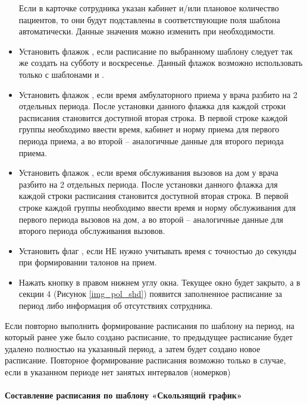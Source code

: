 \begin{itemize}
 Если в карточке сотрудника указан кабинет и/или плановое количество пациентов, то они будут подставлены в соответствующие поля шаблона автоматически. Данные значения можно изменить при необходимости.
 \item Установить флажок , если расписание по выбранному шаблону следует так же создать на субботу и воскресенье. Данный флажок возможно использовать только с шаблонами  и .
 \item Установить флажок , если время амбулаторного приема у врача разбито на 2 отдельных периода. После установки данного флажка для каждой строки расписания становится доступной вторая строка. В первой строке каждой группы необходимо ввести время, кабинет и норму приема для первого периода приема, а во второй – аналогичные данные для второго периода приема.
 \item Установить флажок , если время обслуживания вызовов на дом у врача разбито на 2 отдельных периода. После установки данного флажка для каждой строки расписания становится доступной вторая строка. В первой строке каждой группы необходимо ввести время и норму обслуживания для первого периода вызовов на дом, а во второй – аналогичные данные для второго периода обслуживания вызовов.
 \item Установить флаг , если НЕ нужно учитывать время с точностью до секунды при формировании талонов на прием.
 \item Нажать кнопку   в правом нижнем углу окна. Текущее окно будет закрыто, а в секции 4 (Рисунок \ref{img_pol_shd}) появится заполненное расписание за период либо информация об отсутствиях сотрудника.
\end{itemize}

\begin{prim}
Если повторно выполнить формирование расписания по шаблону на период, на который ранее уже было создано расписание, то предыдущее расписание будет удалено полностью на указанный период, а затем будет создано новое расписание. Повторное формирование расписания возможно только в случае, если в указанном периоде нет занятых интервалов (номерков)   
\end{prim}

\paragraph{Составление расписания по шаблону «Скользящий график»} \label{pol_shdsg}

